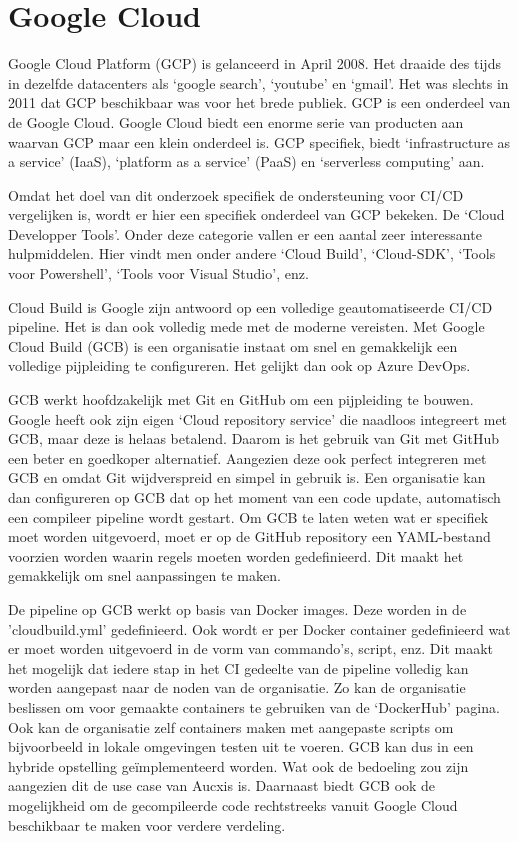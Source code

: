 \section{Google Cloud}
\label{sec:googlecloud}
Google Cloud Platform (GCP) is gelanceerd in April 2008. Het draaide des tijds in dezelfde datacenters als ‘google search’, ‘youtube’ en ‘gmail’. Het was slechts in 2011 dat GCP beschikbaar was voor het brede publiek. GCP is een onderdeel van de Google Cloud. Google Cloud biedt een enorme serie van producten aan waarvan GCP maar een klein onderdeel is. GCP specifiek, biedt ‘infrastructure as a service’ (IaaS), ‘platform as a service’ (PaaS) en ‘serverless computing’ aan. 

Omdat het doel van dit onderzoek specifiek de ondersteuning voor CI/CD vergelijken is, wordt er hier een specifiek onderdeel van GCP bekeken. De ‘Cloud Developper Tools’. Onder deze categorie vallen er een aantal zeer interessante hulpmiddelen. Hier vindt men onder andere ‘Cloud Build’, ‘Cloud-SDK’, ‘Tools voor Powershell’, ‘Tools voor Visual Studio’, enz.

Cloud Build is Google zijn antwoord op een volledige geautomatiseerde CI/CD pipeline. Het is dan ook volledig mede met de moderne vereisten. Met Google Cloud Build (GCB) is een organisatie instaat om snel en gemakkelijk een volledige pijpleiding te configureren. Het gelijkt dan ook op Azure DevOps.

GCB werkt hoofdzakelijk met Git en GitHub om een pijpleiding te bouwen. Google heeft ook zijn eigen ‘Cloud repository service’ die naadloos integreert met GCB, maar deze is helaas betalend. Daarom is het gebruik van Git met GitHub een beter en goedkoper alternatief. Aangezien deze ook perfect integreren met GCB en omdat Git wijdverspreid en simpel in gebruik is. Een organisatie kan dan configureren op GCB dat op het moment van een code update, automatisch een compileer pipeline wordt gestart. Om GCB te laten weten wat er specifiek moet worden uitgevoerd, moet er op de GitHub repository een YAML-bestand voorzien worden waarin regels moeten worden gedefinieerd. Dit maakt het gemakkelijk om snel aanpassingen te maken.

De pipeline op GCB werkt op basis van Docker images. Deze worden in de 'cloudbuild.yml' gedefinieerd. Ook wordt er per Docker container gedefinieerd wat er moet worden uitgevoerd in de vorm van commando’s, script, enz. Dit maakt het mogelijk dat iedere stap in het CI gedeelte van de pipeline volledig kan worden aangepast naar de noden van de organisatie. Zo kan de organisatie beslissen om voor gemaakte containers te gebruiken van de ‘DockerHub’ pagina. Ook kan de organisatie zelf containers maken met aangepaste scripts om bijvoorbeeld in lokale omgevingen testen uit te voeren. GCB kan dus in een hybride opstelling geïmplementeerd worden. Wat ook de bedoeling zou zijn aangezien dit de use case van Aucxis is. Daarnaast biedt GCB ook de mogelijkheid om de gecompileerde code rechtstreeks vanuit Google Cloud beschikbaar te maken voor verdere verdeling.

